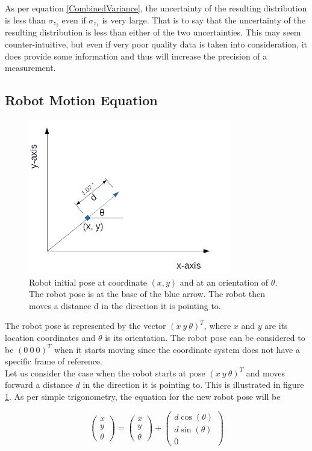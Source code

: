 \documentclass[conference]{IEEEtran}
\begin{document}
As per equation \ref{CombinedVariance}, the uncertainty of the resulting distribution is less than $\sigma_{z_2}$ even if $\sigma_{z_1}$ is very large. That is to say that the uncertainty of the resulting distribution is less than either of the two uncertainties. This may seem counter-intuitive, but even if very poor quality data is taken into consideration, it does provide some information and thus will increase the precision of a measurement.

\subsection{Robot Motion Equation}
\label{sssec:num2} 

\begin{figure}
\centering
\includegraphics[width=3.5in]{./figures/RobotPose.png}
\caption{Robot initial pose at coordinate $(x,y)$ and at an orientation of $\theta$. The robot pose is at the base of the blue arrow. The robot then moves a distance d in the direction it is pointing to.}
\label{RobotPose}
\end{figure}

The robot pose is represented by the vector $(x~y~\theta)^T$, where $x$ and $y$ are its location coordinates and $\theta$ is its orientation. The robot pose can be considered to be $(0~0~0)^T$ when it starts moving since the coordinate system does not have a specific frame of reference.\\

Let us consider the case when the robot starts at pose $(x~y~\theta)^T$ and moves forward a distance $d$ in the direction it is pointing to. This is illustrated in figure \ref{RobotPose}. As per simple trigonometry, the equation for the new robot pose will be

\begin{equation}\label{RobotForwardMotion}
\begin{pmatrix}
	x\\
	y\\
	\theta
\end{pmatrix} = 
\begin{pmatrix}
	x\\
	y\\
	\theta
\end{pmatrix}
+
\begin{pmatrix}
	d\cos(\theta)\\
	d\sin(\theta)\\
	0
\end{pmatrix}
\end{equation}\\
\end{document}
